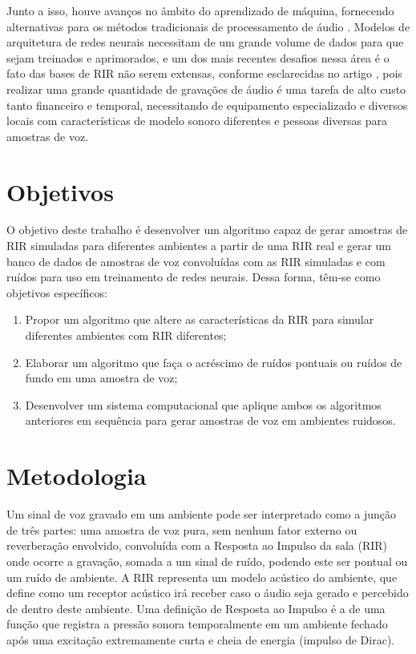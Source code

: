 Junto a isso, houve avanços no âmbito do aprendizado de máquina, fornecendo alternativas para os métodos tradicionais
de processamento de áudio \cite{ML_Speech_Rec}.
Modelos de arquitetura de redes neurais necessitam de um grande volume de dados para que sejam treinados e aprimorados, e um dos mais recentes
desafios nessa área é o fato das bases de RIR não serem extensas, conforme esclarecidas no artigo \cite{Estimation_RT_DRR},
pois realizar uma grande quantidade de gravações de áudio é uma tarefa de alto custo tanto financeiro e temporal, necessitando de equipamento especializado
e diversos locais com características de modelo sonoro diferentes e pessoas diversas para amostras de voz.


\section{Objetivos}

O objetivo deste trabalho é desenvolver um algoritmo capaz de gerar amostras de RIR simuladas para diferentes ambientes a partir de uma RIR real e
gerar um banco de dados de amostras de voz convoluídas com as RIR simuladas e com ruídos para uso em treinamento de redes neurais.
Dessa forma, têm-se como objetivos específicos:

\begin{enumerate}
      \item Propor um algoritmo que altere as características da RIR para simular diferentes ambientes com RIR diferentes;
      \item Elaborar um algoritmo que faça o acréscimo de ruídos pontuais ou ruídos de fundo em uma amostra de voz;
      \item Desenvolver um sistema computacional que aplique ambos os algoritmos anteriores em sequência para gerar
      amostras de voz em ambientes ruidosos.
\end{enumerate}


\section{Metodologia}

Um sinal de voz gravado em um ambiente pode ser interpretado como a junção de três partes: uma amostra de voz pura, sem nenhum fator externo
ou reverberação envolvido, convoluída com a Resposta ao Impulso da sala (RIR) onde ocorre a gravação, somada a um sinal de ruído, podendo este 
ser pontual ou um ruído de ambiente. A RIR representa um modelo acústico do ambiente, que define como um receptor acústico irá receber caso o áudio
seja gerado e percebido de dentro deste ambiente. Uma definição de Resposta ao Impulso é a de uma função que registra a pressão sonora temporalmente
em um ambiente fechado após uma excitação extremamente curta e cheia de energia (impulso de Dirac).

